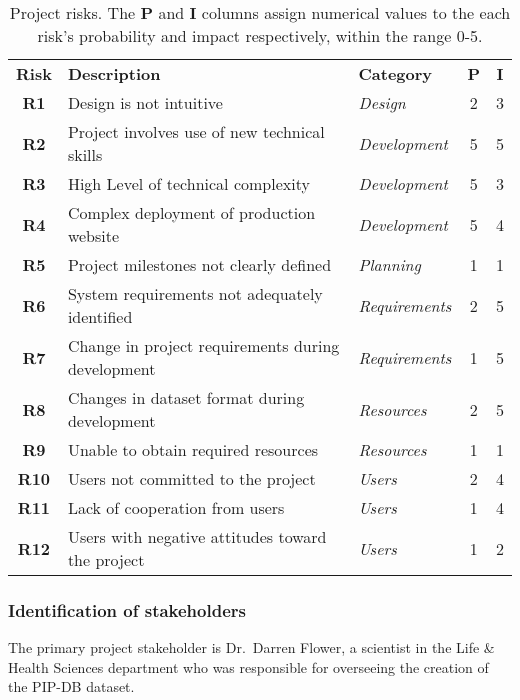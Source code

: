 \begin{table}[H]
\centering
\begin{tabular}{c l l c c}
\textbf{Risk} & \textbf{Description}                              & \textbf{Category}     & \textbf{P} & \textbf{I}\\
\textbf{R1}   & Design is not intuitive                           & \textit{Design}       & 2          & 3\\
\textbf{R2}   & Project involves use of new technical skills      & \textit{Development}  & 5          & 5\\
\textbf{R3}   & High Level of technical complexity                & \textit{Development}  & 5          & 3\\
\textbf{R4}   & Complex deployment of production website          & \textit{Development}  & 5          & 4\\
\textbf{R5}   & Project milestones not clearly defined            & \textit{Planning}     & 1          & 1\\
\textbf{R6}   & System requirements not adequately identified     & \textit{Requirements} & 2          & 5\\
\textbf{R7}   & Change in project requirements during development & \textit{Requirements} & 1          & 5\\
\textbf{R8}   & Changes in dataset format during development      & \textit{Resources}    & 2          & 5\\
\textbf{R9}   & Unable to obtain required resources               & \textit{Resources}    & 1          & 1\\
\textbf{R10}  & Users not committed to the project                & \textit{Users}        & 2          & 4\\
\textbf{R11}  & Lack of cooperation from users                    & \textit{Users}        & 1          & 4\\
\textbf{R12}  & Users with negative attitudes toward the project  & \textit{Users}        & 1          & 2\\
\end{tabular}
\caption[Project risks]
        {Project risks. The \textbf{P} and \textbf{I} columns assign
         numerical values to the each risk's probability and impact
         respectively, within the range 0-5.}
\label{tab:risks}
\end{table}

\subsubsection*{Identification of stakeholders}

The primary project stakeholder is Dr.\ Darren Flower, a scientist in
the Life \& Health Sciences department who was responsible for
overseeing the creation of the PIP-DB dataset.
